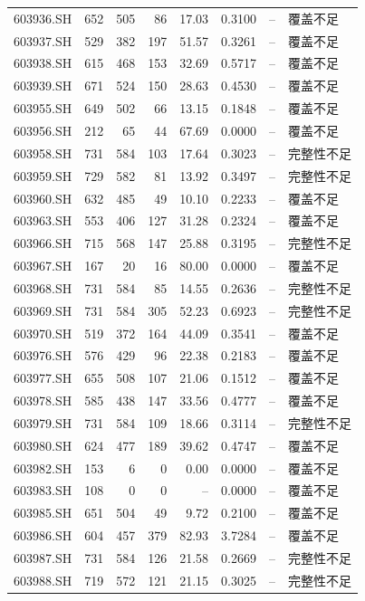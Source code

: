 \documentclass[10pt,a4paper]{article}
\begin{document}
\begin{longtable}{lrrr r r r l}
603936.SH & 652 & 505 & 86 & 17.03 & 0.3100 & -- & 覆盖不足\\
603937.SH & 529 & 382 & 197 & 51.57 & 0.3261 & -- & 覆盖不足\\
603938.SH & 615 & 468 & 153 & 32.69 & 0.5717 & -- & 覆盖不足\\
603939.SH & 671 & 524 & 150 & 28.63 & 0.4530 & -- & 覆盖不足\\
603955.SH & 649 & 502 & 66 & 13.15 & 0.1848 & -- & 覆盖不足\\
603956.SH & 212 & 65 & 44 & 67.69 & 0.0000 & -- & 覆盖不足\\
603958.SH & 731 & 584 & 103 & 17.64 & 0.3023 & -- & 完整性不足\\
603959.SH & 729 & 582 & 81 & 13.92 & 0.3497 & -- & 完整性不足\\
603960.SH & 632 & 485 & 49 & 10.10 & 0.2233 & -- & 覆盖不足\\
603963.SH & 553 & 406 & 127 & 31.28 & 0.2324 & -- & 覆盖不足\\
603966.SH & 715 & 568 & 147 & 25.88 & 0.3195 & -- & 完整性不足\\
603967.SH & 167 & 20 & 16 & 80.00 & 0.0000 & -- & 覆盖不足\\
603968.SH & 731 & 584 & 85 & 14.55 & 0.2636 & -- & 完整性不足\\
603969.SH & 731 & 584 & 305 & 52.23 & 0.6923 & -- & 完整性不足\\
603970.SH & 519 & 372 & 164 & 44.09 & 0.3541 & -- & 覆盖不足\\
603976.SH & 576 & 429 & 96 & 22.38 & 0.2183 & -- & 覆盖不足\\
603977.SH & 655 & 508 & 107 & 21.06 & 0.1512 & -- & 覆盖不足\\
603978.SH & 585 & 438 & 147 & 33.56 & 0.4777 & -- & 覆盖不足\\
603979.SH & 731 & 584 & 109 & 18.66 & 0.3114 & -- & 完整性不足\\
603980.SH & 624 & 477 & 189 & 39.62 & 0.4747 & -- & 覆盖不足\\
603982.SH & 153 & 6 & 0 & 0.00 & 0.0000 & -- & 覆盖不足\\
603983.SH & 108 & 0 & 0 & -- & 0.0000 & -- & 覆盖不足\\
603985.SH & 651 & 504 & 49 & 9.72 & 0.2100 & -- & 覆盖不足\\
603986.SH & 604 & 457 & 379 & 82.93 & 3.7284 & -- & 覆盖不足\\
603987.SH & 731 & 584 & 126 & 21.58 & 0.2669 & -- & 完整性不足\\
603988.SH & 719 & 572 & 121 & 21.15 & 0.3025 & -- & 完整性不足\\

\end{longtable}
\end{document}
